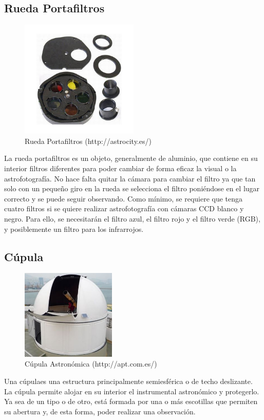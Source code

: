 \subsection{Rueda Portafiltros}
\begin{figure}[htb]
\centering
\includegraphics[width=0.5\textwidth]{./imagenes/ruedaPortafiltros}
\caption{Rueda Portafiltros (http://astrocity.es/)} \label{fig:ruedaPortafiltros}
\end{figure}
La rueda portafiltros es un objeto, generalmente de aluminio, que contiene en su interior filtros diferentes para poder cambiar de forma eficaz la visual o la astrofotografía. No hace falta quitar la cámara para cambiar el filtro ya que tan solo con un pequeño giro en la rueda se selecciona el filtro poniéndose en el lugar correcto y se puede seguir observando.
Como mínimo, se requiere que tenga cuatro filtros si se quiere realizar astrofotografía con cámaras CCD blanco y negro. Para ello, se necesitarán el filtro azul, el filtro rojo y el filtro verde (RGB), y posiblemente un filtro para los infrarrojos.


\subsection{Cúpula}
\begin{figure}[htb]
\centering
\includegraphics[width=0.4\textwidth]{./imagenes/cupula}
\caption{Cúpula Astronómica (http://apt.com.es/)} \label{fig:cupula}
\end{figure}
Una cúpulaes una estructura principalmente semiesférica o de techo deslizante. La cúpula permite alojar en su interior el instrumental astronómico y protegerlo. Ya sea de un tipo o de otro, está formada por una o más escotillas que permiten su abertura y, de esta forma, poder realizar una observación.


